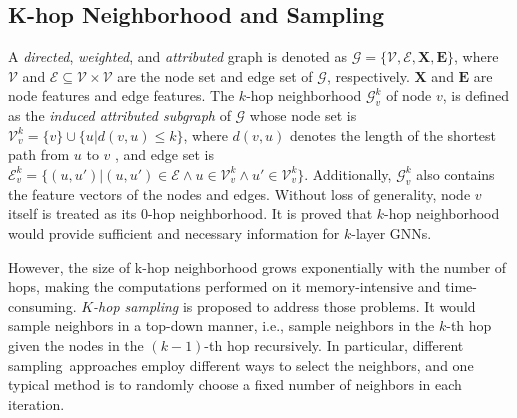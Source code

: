 \documentclass[conference]{IEEEtran}
\begin{document}
\subsection{K-hop Neighborhood and Sampling}
A \emph{directed}, \emph{weighted}, and \emph{attributed} graph is denoted as
$\mathcal{G}=\{\mathcal{V},\mathcal{E},\mathbf{X},\mathbf{E}\}$, where
$\mathcal{V}$ and $\mathcal{E} \subseteq \mathcal{V} \times \mathcal{V}$ are the
node set and edge set of $\mathcal{G}$, respectively. 
$\mathbf{X}$ and $\mathbf{E}$ are node features and edge features.
The $k$-hop neighborhood $\mathcal{G}_v^k$ of node $v$, is defined as the \emph{induced attributed subgraph} 
of $\mathcal{G}$ whose node set is
$\mathcal{V}_v^k = \{v\} \cup \{u | d(v,u) \leq k\}$, where $d(v,u)$ denotes 
the length of the shortest path from $u$ to $v$
, and edge set is $\mathcal{E}_v^k = \{(u,u') | (u,u')\in \mathcal{E} 
\land u\in\mathcal{V}_v^k \land u'\in\mathcal{V}_v^k \}$. 
Additionally, $\mathcal{G}_v^k$ also contains the feature vectors of the nodes and edges. %
Without loss of generality, node $v$ itself is treated as its $0$-hop neighborhood.
It is proved that $k$-hop neighborhood would provide sufficient and necessary information for $k$-layer GNNs\cite{b17}.

However, the size of k-hop neighborhood grows exponentially with the number of hops, making the computations performed on it memory-intensive and time-consuming.
\emph{$K$-hop sampling} is proposed to address those problems. It would sample neighbors in a top-down manner, i.e., sample neighbors in the $k$-th hop given the nodes in the $(k-1)$-th hop recursively.
In particular, different sampling approaches\cite{b4, b10, b17, b17append, b17append2} employ different ways to select the neighbors, and one typical method is to randomly choose a fixed number of neighbors in each iteration.
\end{document}
